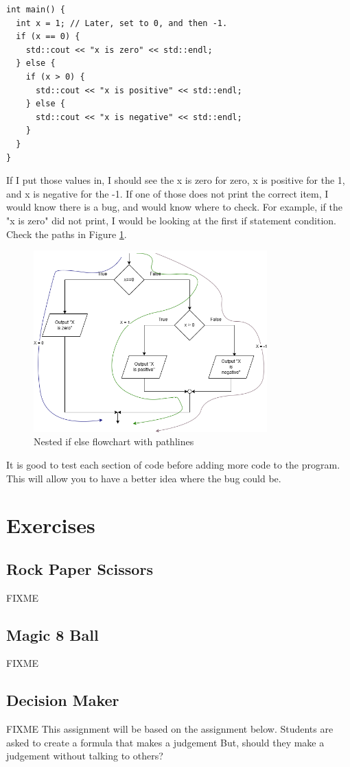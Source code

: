 \begin{lstlisting}
int main() {
  int x = 1; // Later, set to 0, and then -1.
  if (x == 0) {
    std::cout << "x is zero" << std::endl;
  } else {
    if (x > 0) {
      std::cout << "x is positive" << std::endl;
    } else {
      std::cout << "x is negative" << std::endl;
    }
  }
}
\end{lstlisting}
If I put those values in, I should see the x is zero for zero, x is
positive for the 1, and x is negative for the -1. If one of those does not print the correct item, I would know there is a bug, and 
would know where to check. For example, if the "x is zero" did not print, I would be looking at the first if statement condition. Check
the paths in Figure \ref{fig:nestedpath}.

\begin{figure}[h]
    \centering
    \includegraphics[width=9cm]{images/nestedifflow - Path.png}
    \caption{Nested if else flowchart with pathlines}
    \label{fig:nestedpath}
\end{figure}
It is good to test each section of code before adding more code
to the program. This will allow you to have a better idea where the
bug could be.

\section{Exercises}
\subsection{Rock Paper Scissors}
FIXME
\subsection{Magic 8 Ball}
FIXME
\subsection{Decision Maker}
FIXME
This assignment will be based on the assignment below.
Students are asked to create a formula that makes a judgement
But, should they make a judgement without talking to others?

